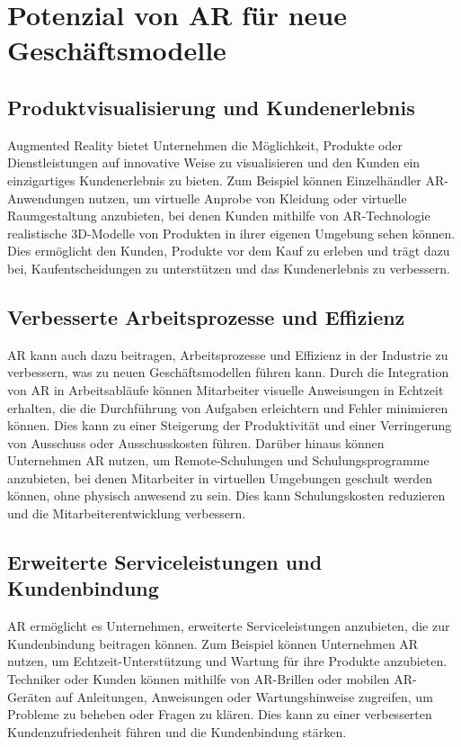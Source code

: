 
\section{Potenzial von AR für neue Geschäftsmodelle}
\subsection{Produktvisualisierung und Kundenerlebnis}
Augmented Reality bietet Unternehmen die Möglichkeit, Produkte oder
Dienstleistungen auf innovative Weise zu visualisieren und den Kunden ein
einzigartiges Kundenerlebnis zu bieten. Zum Beispiel können Einzelhändler
AR-Anwendungen nutzen, um virtuelle Anprobe von Kleidung oder virtuelle
Raumgestaltung anzubieten, bei denen Kunden mithilfe von AR-Technologie
realistische 3D-Modelle von Produkten in ihrer eigenen Umgebung sehen können.
Dies ermöglicht den Kunden, Produkte vor dem Kauf zu erleben und trägt dazu
bei, Kaufentscheidungen zu unterstützen und das Kundenerlebnis zu verbessern.

\subsection{Verbesserte Arbeitsprozesse und Effizienz}
AR kann auch dazu beitragen, Arbeitsprozesse und Effizienz in der Industrie zu
verbessern, was zu neuen Geschäftsmodellen führen kann. Durch die Integration
von AR in Arbeitsabläufe können Mitarbeiter visuelle Anweisungen in Echtzeit
erhalten, die die Durchführung von Aufgaben erleichtern und Fehler minimieren
können. Dies kann zu einer Steigerung der Produktivität und einer Verringerung
von Ausschuss oder Ausschusskosten führen. Darüber hinaus können Unternehmen AR
nutzen, um Remote-Schulungen und Schulungsprogramme anzubieten, bei denen
Mitarbeiter in virtuellen Umgebungen geschult werden können, ohne physisch
anwesend zu sein. Dies kann Schulungskosten reduzieren und die
Mitarbeiterentwicklung verbessern.

\subsection{Erweiterte Serviceleistungen und Kundenbindung}
AR ermöglicht es Unternehmen, erweiterte Serviceleistungen anzubieten, die zur
Kundenbindung beitragen können. Zum Beispiel können Unternehmen AR nutzen, um
Echtzeit-Unterstützung und Wartung für ihre Produkte anzubieten. Techniker oder
Kunden können mithilfe von AR-Brillen oder mobilen AR-Geräten auf Anleitungen,
Anweisungen oder Wartungshinweise zugreifen, um Probleme zu beheben oder Fragen
zu klären. Dies kann zu einer verbesserten Kundenzufriedenheit führen und die
Kundenbindung stärken.

